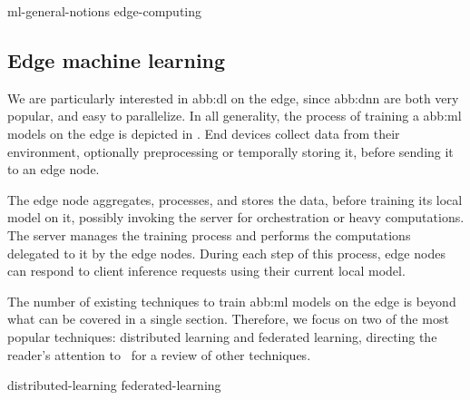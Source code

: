 \begin{table}[h]
\end{table}

{ml-general-notions}
{edge-computing}
\subsection{Edge machine learning}\label{sec:edge_ml}

We are particularly interested in \gls{abb:dl} on the edge,
since \gls{abb:dnn} are both very popular, and easy to parallelize.
In all generality, the process of training a \gls{abb:ml} models on the edge
is depicted in .
End devices collect data from their environment,
optionally preprocessing or temporally storing it,
before sending it to an edge node.
\begin{figure*}[hbt]
	\begin{center}
	\end{center}
	\caption{An end-to-end  training process on the edge.}%
	\label{fig:edge_ml_process}
\end{figure*}
The edge node aggregates, processes, and stores the data,
before training its local model on it,
possibly invoking the server for orchestration or heavy computations.
The server manages the training process
and performs the computations delegated to it by the edge nodes.
During each step of this process,
edge nodes can respond to client inference requests
using their current local model.


The number of existing techniques to train \gls{abb:ml} models on the edge
is beyond what can be covered in a single section.
Therefore, we focus on two of the most popular techniques:
distributed learning and federated learning,
directing the reader's attention to~\cite{khouasTrainingMachineLearning2024}
for a review of other techniques.

{distributed-learning}
{federated-learning}
